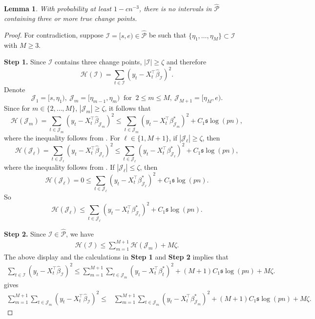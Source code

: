 \documentclass[11pt]{article}
\newcommand{\I}{{\mathcal I }}
\newcommand{\J}{{  \mathcal J } }
\newcommand{\s}{ { \mathfrak{s}  } }
\theoremstyle{plain}
\newtheorem{lemma}[theorem]{Lemma}
\theoremstyle{definition}
\begin{document}
 \begin{lemma} 
With probability  at least $1- cn^{-3}$,    there is no intervals in   $  \widehat { \mathcal P}  $  containing three or more true change points.   
 \end{lemma}  
 


\begin{proof} 
For  contradiction,  suppose    $ \I=[s,e) \in \mathcal {\widehat P}  $  be such that $ \{ \eta_1, \ldots, \eta_M\} \subset \I $ with $M\ge 3$. 

{\bf Step 1.}  Since $\I$ contains three change points, 
 $|\I| \ge \zeta   $ and therefore 
 $$ \mathcal H(\I) = \sum_{t \in \I} (y_t -X_t^\top \widehat \beta_\I )^2 .$$
Denote 
   $$  \J_1 =[s,  \eta_1), \ \J_m = [\eta_{m-1}, \eta_m) \;\; \text{for} \;\;  2 \le m \le M , \ \J_{M+1}  =[\eta_M, e). $$ 
Since for $m\in \{ 2,\ldots, M \}$, $ |\J_ m | \ge \zeta   $, it follows that
$$ \mathcal H(\J_m ) = \sum_{ t  \in \J_m   }(y_t  - X_t ^\top \widehat \beta _{\J_m  }  ) ^2  \le \sum_{t  \in \J_ m   }(y_t  -X_t ^\top     \beta _{\J _ m  }^*  ) ^2 +C_1 \s\log(pn),   $$
where the inequality follows from .  
For $\ell \in \{ 1, M+1  \}$, if  $ |\J_ \ell | \ge \zeta   $, then 
 $$ \mathcal H(\J_ \ell) =\sum_{t  \in \J_\ell }(y_t  -X_t ^\top  \widehat  \beta _{\J_\ell  }  ) ^2 
\le \sum_{t  \in \J_\ell    }(y_t  -X_t ^\top     \beta _{\J _\ell    }^*  ) ^2 +C_1 \s\log(pn), $$
where the inequality follows from .  
If $ |\J_\ell   |  \le  \zeta   $, then 
 $$ \mathcal H(\J_\ell  ) = 0 
\le \sum_{t  \in \J_ \ell   }(y_t  -X_t ^\top     \beta _{\J _\ell   }^*  ) ^2 +C_1 \s\log(pn) . $$
So 
$$ \mathcal H(\J_\ell   )   
\le \sum_{t  \in \J_\ell    }(y_t  -X_t ^\top     \beta _{\J _\ell   }^*  ) ^2 +C_1 \s\log(pn) . $$

 {\bf Step 2.} Since $\I \in \widehat{\mathcal P} $, we have
 \begin{align}\label{eq:regression three change points local min} \mathcal H(\I ) \le \sum_{m=1}^{M+1}\mathcal H (\J_m  )  +  M \zeta. 
 \end{align} The above display and the calculations in  {\bf Step 1} and  {\bf Step 2} implies that
\begin{align} 
 \sum_{t  \in \I }(y_t  -  X_t ^\top \widehat \beta _\I ) ^2  
\le   \sum_{m=1}^{M+1 } \sum_{t  \in \J_m   }(y_t  -   X_t ^\top \beta_t ^*   ) ^2  
 +   (M +1) C_1   \s\log(pn)  
+M  \zeta  .
  \label{eq:regression three change points step 2 term 1}
\end{align}
  gives 
\begin{align} 
 \sum_{m=1}^{M+1}  \sum_{t  \in \J_m   }(y_t  - X_t ^\top  \widehat \beta _\I ) ^2 
 \le& \sum_{m=1}^{M+1} \sum_{t  \in \J_  m   }(y_t  -  X_t ^\top    \beta^*  _{\J_m  }  ) ^2    
 +  (M +1) C_1   \s\log(pn)  
+M  \zeta     \label{eq:regression three change points first}.   
\end{align}   
     

\end{proof}
\end{document}
